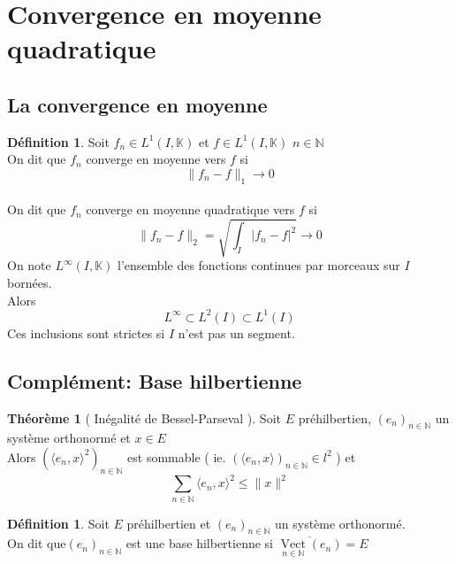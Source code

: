 \documentclass[10pt,a4paper]{article}
\theoremstyle{definition}
\newtheorem{theorem}[proposition]{Théorème}
\newtheorem{definition}[proposition]{Définition}
\DeclareMathOperator*{\vect}{Vect}
\begin{document}
\section{Convergence en moyenne quadratique}
\subsection{La convergence en moyenne}
\begin{definition}
    Soit \(f_n \in L^1(I, \mathbb{K})\) et \(f \in L^1(I, \mathbb{K})\) \(n \in \mathbb{N}\) \\
    On dit que \(f_n\) converge en moyenne vers \(f\) si \[\lVert f_n - f \rVert_1 \to 0\] \\
    On dit que \(f_n\) converge en moyenne quadratique vers \(f\) si \[\lVert f_n - f \rVert_2 = \sqrt{\int_{I}|f_n - f|^2} \to 0\]
    On note \(L^\infty(I, \mathbb{K})\) l'ensemble des fonctions continues par morceaux sur \(I\) bornées. \\
    Alors \[\boxed{L^\infty \subset L^2(I) \subset L^1(I)}\]
    Ces inclusions sont strictes si \(I\) n'est pas un segment.
\end{definition}

\subsection{Complément: Base hilbertienne}
\begin{theorem}[ Inégalité de Bessel-Parseval ]
    Soit \(E\) préhilbertien, \((e_n)_{n \in \mathbb{N}}\) un système orthonormé et \(x \in E\) \\
    Alors \(\left( \langle e_n, x \rangle^2 \right)_{n \in \mathbb{N}}\) est sommable ( ie. \(\left(\langle e_n, x \rangle \right)_{n \in \mathbb{N}} \in l^2\) ) et
    \[\sum_{n \in \mathbb{N}} \langle e_n, x \rangle^2 \leq \lVert x \rVert^2\]
\end{theorem}
\begin{definition}
    Soit \(E\) préhilbertien et \((e_n)_{n \in \mathbb{N}}\) un système orthonormé. \\
    On dit que\((e_n)_{n \in \mathbb{N}}\) est une base hilbertienne si \(\overline{\vect\limits_{n \in \mathbb{N}}(e_n)} = E\)
\end{definition}
\end{document}
